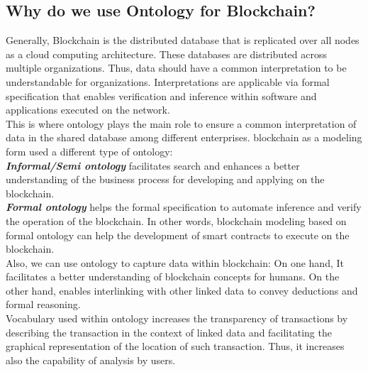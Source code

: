 \subsection{Why do we use Ontology for Blockchain?}
Generally, Blockchain is the distributed database that is replicated over all nodes as a cloud computing architecture. These databases are distributed across multiple organizations. Thus, data should have a common interpretation to be understandable for organizations. Interpretations are applicable via formal specification that enables verification and inference within software and applications executed on the network. \\
This is where ontology plays the main role to ensure a common interpretation of data in the shared database among different enterprises.
blockchain as a modeling form used a different type of ontology: \\
\textbf{\textit{Informal/Semi ontology}} facilitates search and enhances a better understanding of the business process for developing and applying on the blockchain.\\
\textbf{\textit{Formal ontology}} helps the formal specification to automate inference and verify the operation of the blockchain. In other words, blockchain modeling based on formal ontology can help the development of smart contracts to execute on the blockchain.\\
Also, we can use ontology to capture data within blockchain: On one hand, It facilitates a better understanding of blockchain concepts for humans. On the other hand, enables interlinking with other linked data to convey deductions and formal reasoning\cite{Kim}.\\
Vocabulary used within ontology increases the transparency of transactions by describing the transaction in the context of linked data and facilitating the graphical representation of the location of such transaction. Thus, it increases also the capability of analysis by users\cite{Kim}.

